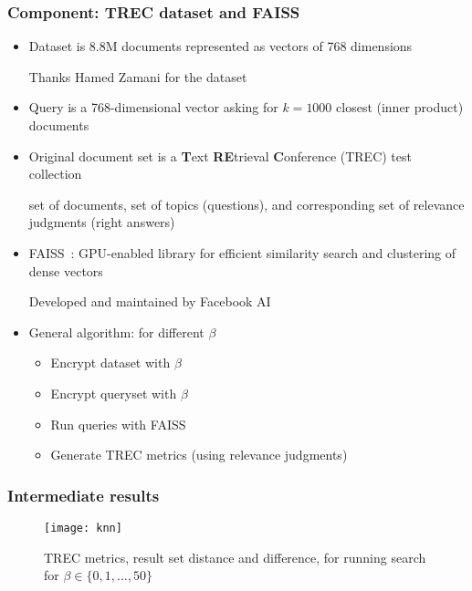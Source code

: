 	\begin{frame}[label={frame:appendix:trec-faiss}]

		\frametitle{Component: TREC dataset and FAISS~\cite{faiss}}

		\begin{itemize}
			\item<1->
				Dataset is 8.8M documents represented as vectors of 768 dimensions \\
				\begin{small}
					Thanks Hamed Zamani for the dataset
				\end{small}

			\item<2->
				Query is a 768-dimensional vector asking for $k = \num{1000}$ closest (inner product) documents

			\item<3->
				Original document set is a \textbf{T}ext \textbf{RE}trieval \textbf{C}onference (TREC) test collection \\
				\begin{small}
					set of documents, set of topics (questions), and corresponding set of relevance judgments (right answers)
				\end{small}

			\item<4->
				FAISS~\cite{faiss}: GPU-enabled library for efficient similarity search and clustering of dense vectors
				\begin{small}
					Developed and maintained by Facebook AI
				\end{small}

			\item<5->
				General algorithm: for different $\beta$
				\begin{itemize}
					\item Encrypt dataset with $\beta$
					\item Encrypt queryset with $\beta$
					\item Run queries with FAISS
					\item Generate TREC metrics (using relevance judgments)
				\end{itemize}

		\end{itemize}

		\hyperlink{frame:knn}{}

	\end{frame}

	\begin{frame}[label={frame:appendix:knn-plot}]

		\frametitle{Intermediate results}

		\begin{figure}[h]
			\centering
			\texttt{[image: knn]}
			\caption{
				TREC metrics, result set distance and difference, for running \knn{} search for $\beta \in \{ 0, 1, \ldots , 50 \} $ \\
				\hyperlink{frame:knn}{}
			}
		\end{figure}

	\end{frame}
